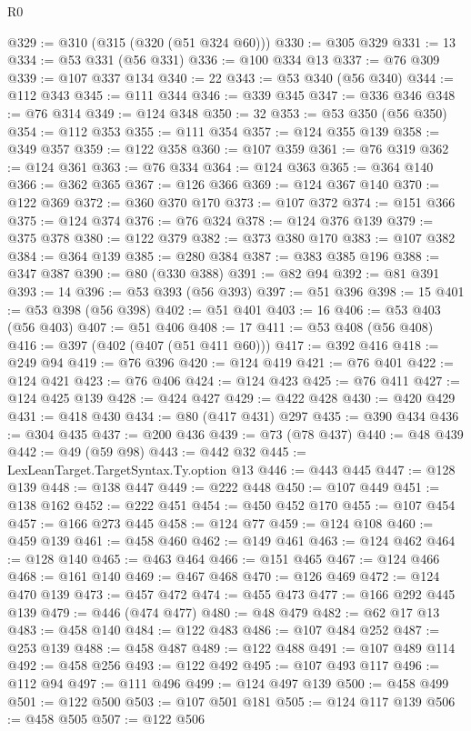 \begin{lexlean}{R0}
\begin{coremodule}
@329 := @310 (@315 (@320 (@51 @324 @60)))
@330 := @305 @329
@331 := 13
@334 := @53 @331 (@56 @331)
@336 := @100 @334 @13
@337 := @76 @309
@339 := @107 @337 @134
@340 := 22
@343 := @53 @340 (@56 @340)
@344 := @112 @343
@345 := @111 @344
@346 := @339 @345
@347 := @336 @346
@348 := @76 @314
@349 := @124 @348
@350 := 32
@353 := @53 @350 (@56 @350)
@354 := @112 @353
@355 := @111 @354
@357 := @124 @355 @139
@358 := @349 @357
@359 := @122 @358
@360 := @107 @359
@361 := @76 @319
@362 := @124 @361
@363 := @76 @334
@364 := @124 @363
@365 := @364 @140
@366 := @362 @365
@367 := @126 @366
@369 := @124 @367 @140
@370 := @122 @369
@372 := @360 @370 @170
@373 := @107 @372
@374 := @151 @366
@375 := @124 @374
@376 := @76 @324
@378 := @124 @376 @139
@379 := @375 @378
@380 := @122 @379
@382 := @373 @380 @170
@383 := @107 @382
@384 := @364 @139
@385 := @280 @384
@387 := @383 @385 @196
@388 := @347 @387
@390 := @80 (@330 @388)
@391 := @82 @94
@392 := @81 @391
@393 := 14
@396 := @53 @393 (@56 @393)
@397 := @51 @396
@398 := 15
@401 := @53 @398 (@56 @398)
@402 := @51 @401
@403 := 16
@406 := @53 @403 (@56 @403)
@407 := @51 @406
@408 := 17
@411 := @53 @408 (@56 @408)
@416 := @397 (@402 (@407 (@51 @411 @60)))
@417 := @392 @416
@418 := @249 @94
@419 := @76 @396
@420 := @124 @419
@421 := @76 @401
@422 := @124 @421
@423 := @76 @406
@424 := @124 @423
@425 := @76 @411
@427 := @124 @425 @139
@428 := @424 @427
@429 := @422 @428
@430 := @420 @429
@431 := @418 @430
@434 := @80 (@417 @431) @297
@435 := @390 @434
@436 := @304 @435
@437 := @200 @436
@439 := @73 (@78 @437)
@440 := @48 @439
@442 := @49 (@59 @98)
@443 := @442 @32
@445 := LexLeanTarget.TargetSyntax.Ty.option @13
@446 := @443 @445
@447 := @128 @139
@448 := @138 @447
@449 := @222 @448
@450 := @107 @449
@451 := @138 @162
@452 := @222 @451
@454 := @450 @452 @170
@455 := @107 @454
@457 := @166 @273 @445
@458 := @124 @77
@459 := @124 @108
@460 := @459 @139
@461 := @458 @460
@462 := @149 @461
@463 := @124 @462
@464 := @128 @140
@465 := @463 @464
@466 := @151 @465
@467 := @124 @466
@468 := @161 @140
@469 := @467 @468
@470 := @126 @469
@472 := @124 @470 @139
@473 := @457 @472
@474 := @455 @473
@477 := @166 @292 @445 @139
@479 := @446 (@474 @477)
@480 := @48 @479
@482 := @62 @17 @13
@483 := @458 @140
@484 := @122 @483
@486 := @107 @484 @252
@487 := @253 @139
@488 := @458 @487
@489 := @122 @488
@491 := @107 @489 @114
@492 := @458 @256
@493 := @122 @492
@495 := @107 @493 @117
@496 := @112 @94
@497 := @111 @496
@499 := @124 @497 @139
@500 := @458 @499
@501 := @122 @500
@503 := @107 @501 @181
@505 := @124 @117 @139
@506 := @458 @505
@507 := @122 @506

\end{coremodule}
\end{lexlean}
